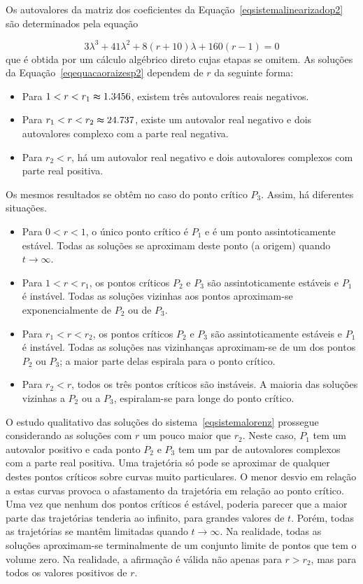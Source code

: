 Os autovalores da matriz dos coeficientes da Equação~\ref{eqsistemalinearizadop2} são determinados pela equação

\begin{equation}
3\lambda^3+41\lambda^2+8(r+10)\lambda+160(r-1)=0
\label{eqequacaoraizesp2}
\end{equation}
que é obtida por um cálculo algébrico direto cujas etapas se omitem. As soluções da Equação~\ref{eqequacaoraizesp2} dependem de $r$ da seguinte forma:

\begin{itemize}
\item Para $1<r<r_{1}\thickapprox1.3456$, existem três autovalores reais negativos.
\item Para $r_{1}<r<r_{2}\thickapprox24.737$, existe um autovalor real negativo e dois autovalores complexo com a parte real negativa.
\item Para $r_{2}<r$, há um autovalor real negativo e dois autovalores complexos com parte real positiva.
\end{itemize}

Os mesmos resultados se obtêm no caso do ponto crítico $P_{3}$. Assim, há diferentes situações.

\begin{itemize}
\item Para $0<r<1$, o único ponto crítico é $P_{1}$ e é um ponto assintoticamente estável. Todas as soluções se aproximam deste ponto (a origem) quando $t\rightarrow\infty$.
\item Para $1<r<r_{1}$, os pontos críticos $P_{2}$ e $P_{3}$ são assintoticamente estáveis e $P_{1}$ é instável. Todas as soluções vizinhas aos pontos aproximam-se exponencialmente de $P_{2}$ ou de $P_{3}$.
\item Para $r_{1}<r<r_{2}$, os pontos críticos $P_{2}$ e $P_{3}$ são assintoticamente estáveis e $P_{1}$ é instável. Todas as soluções nas vizinhanças aproximam-se de um dos pontos $P_{2}$ ou $P_{3}$; a maior parte delas espirala para o ponto crítico.
\item Para $r_{2}<r$, todos os três pontos críticos são instáveis. A maioria das soluções vizinhas a $P_{2}$ ou a $P_{3}$, espiralam-se para longe do ponto crítico. 
\end{itemize}

O estudo qualitativo das soluções do sistema~\ref{eqsistemalorenz} prossegue considerando as soluções com $r$ um pouco maior que $r_{2}$. Neste caso, $P_{1}$ tem um autovalor positivo e cada ponto $P_{2}$ e $P_{3}$ tem um par de autovalores complexos com a parte real positiva. Uma trajetória só pode se aproximar de qualquer destes pontos críticos sobre curvas muito particulares. O menor desvio em relação a estas curvas provoca o afastamento da trajetória em relação ao ponto crítico. Uma vez que nenhum dos pontos críticos é estável, poderia parecer que a maior parte das trajetórias tenderia ao infinito, para grandes valores de $t$. Porém, todas as trajetórias se mantêm limitadas quando $t\rightarrow\infty$. Na realidade, todas as soluções aproximam-se terminalmente de um conjunto limite de pontos que tem o volume zero. Na realidade, a afirmação é válida não apenas para $r>r_{2}$, mas para todos os valores positivos de $r$.

